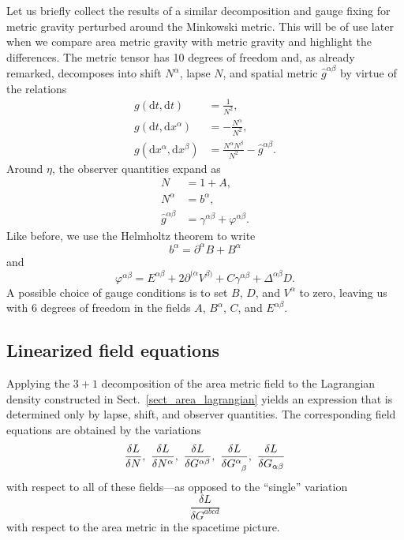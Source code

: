Let us briefly collect the results of a similar decomposition and gauge fixing for metric gravity perturbed around the Minkowski metric. This will be of use later when we compare area metric gravity with metric gravity and highlight the differences. The metric tensor has 10 degrees of freedom and, as already remarked, decomposes into shift $N^\alpha$, lapse $N$, and spatial metric $\hat g^{\alpha\beta}$ by virtue of the relations
\begin{equation}\label{metric_three_plus_one}
  \begin{aligned}
    g(\mathrm dt,\mathrm dt) &{} = \frac{1}{N^2}, \\
    g(\mathrm dt,\mathrm dx^\alpha) &{} = -\frac{N^\alpha}{N^2}, \\
    g(\mathrm dx^\alpha,\mathrm dx^\beta) &{} = \frac{N^\alpha N^\beta}{N^2} - \hat g^{\alpha\beta}.
  \end{aligned}
\end{equation}
Around $\eta$, the observer quantities expand as
\begin{equation}\label{metric_expansion}
  \begin{aligned}
    N &{} = 1 + A, \\
    N^\alpha &{} = b^\alpha, \\
    \hat g^{\alpha\beta} &{} = \gamma^{\alpha\beta} + \varphi^{\alpha\beta}.
  \end{aligned}
\end{equation}
Like before, we use the Helmholtz theorem to write
\begin{equation}
  b^\alpha = \partial^\alpha B + B^\alpha
\end{equation}
and
\begin{equation}\label{metric_split}
  \varphi^{\alpha\beta} = E^{\alpha\beta} + 2\partial^{(\alpha}V^{\beta)} + C \gamma^{\alpha\beta} + \Delta^{\alpha\beta} D.
\end{equation}
A possible choice of gauge conditions is to set $B$, $D$, and $V^\alpha$ to zero, leaving us with 6 degrees of freedom in the fields $A$, $B^\alpha$, $C$, and $E^{\alpha\beta}$.

\subsection{Linearized field equations}\label{sect_area_linear_eom}
Applying the $3+1$ decomposition of the area metric field to the Lagrangian density constructed in Sect.~\ref{sect_area_lagrangian} yields an expression that is determined only by lapse, shift, and observer quantities. The corresponding field equations are obtained by the variations
\begin{equation}
  \frac{\delta L}{\delta N},\ \frac{\delta L}{\delta N^\alpha},\ \frac{\delta L}{\delta G^{\alpha\beta}},\ \frac{\delta L}{\delta G^\alpha_{\hphantom\alpha\beta}},\ \frac{\delta L}{\delta G_{\alpha\beta}}
\end{equation}
with respect to all of these fields---as opposed to the ``single'' variation
\begin{equation}
  \frac{\delta L}{\delta G^{abcd}}
\end{equation}
with respect to the area metric in the spacetime picture.

